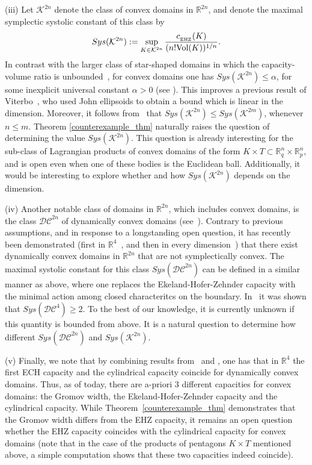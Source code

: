 \documentclass[10pt,a4paper]{article}
\theoremstyle{definition}
\newcommand{\R}{{\mathbb{R}}}
\newcommand{\ehzcap}{c_{_{\rm EHZ}}}
\begin{document}
(iii) Let $\mathcal K^{2n}$ denote the class of convex domains in $\R^{2n}$, and denote the 
maximal symplectic systolic constant of this class by  $$ Sys(\mathcal K^{2n}) := \sup_{K \in \mathcal K^{2n}} \frac{\ehzcap(K)}{(n! \text{Vol}(K))^{1/n}}.$$ 
In contrast with the larger class of star-shaped domains in which the capacity-volume ratio is unbounded~\cite{hermann}, for convex domains one has $Sys(\mathcal K^{2n}) \leq \alpha$, for some inexplicit universal constant $\alpha > 0$ (see \cite{ArtsteinAvidanOstroverMilman}). This improves a previous result of Viterbo~\cite{viterbo2000}, who used John ellipsoids to obtain a bound which is linear in the dimension. Moreover, it follows from~\cite{p-prod} that $Sys(\mathcal K^{2n}) \leq Sys(\mathcal K^{2m})$, whenever $n \leq m$.
Theorem \ref{counterexample_thm} naturally raises the question of determining the value $Sys(\mathcal K^{2n})$. 
This question is already interesting for the sub-class  of Lagrangian products of convex domains of the form $K\times T \subset \R_q^n \times \R^n_p$, and is open even when one of these bodies is the Euclidean  ball. 
 Additionally, it would  be interesting to explore whether and how $Sys(\mathcal K^{2n})$ depends on the dimension. 


\medskip

(iv) Another notable class of domains in $\R^{2n}$, which includes convex domains, is the class $\mathcal {DC}^{2n}$ of dynamically convex domains (see~\cite{HWZ-3dconvex}).
Contrary to previous assumptions, and in response to a longstanding open question, it has recently been demonstrated (first in $\R^4$~\cite{dynconvnotconvdim4}, and then in every dimension~\cite{dynconvnotconvdim2n}) that 
there exist dynamically convex domains in $\R^{2n}$
that are not
symplectically convex.
The maximal systolic constant for this class $Sys(\mathcal {DC}^{2n})$ can be defined in a similar manner  as above, where one replaces the Ekeland-Hofer-Zehnder capacity with the minimal action among closed characteritcs on the boundary. In~\cite{Systolicratio} it was shown that $Sys(\mathcal {DC}^{4}) \geq 2$. To the best of our knowledge, it is currently unknown if this quantity is bounded from above.  
It is a natural question  to determine how different $Sys(\mathcal {DC}^{2n})$ and $Sys(\mathcal {K}^{2n})$.



\medskip 

(v) Finally, we note that
by combining %
results from~\cite{edtmair} and \cite{Hryniewicz-Hutchings-Ramos}, one has that in $\R^4$ the first ECH capacity and the cylindrical capacity coincide for dynamically convex domains.
Thus, as of today, there are a-priori 3 different capacities for convex domains: the Gromov width, the Ekeland-Hofer-Zehnder capacity and the cylindrical capacity. 
While Theorem~\ref{counterexample_thm} demonstrates that the Gromov width differs from the EHZ capacity, it remains an  open question whether the EHZ capacity coincides with the cylindrical capacity for convex domains (note that in the case of the products of pentagons $K \times T$ mentioned above, a simple computation shows that these two capacities indeed coincide). 
\end{document}
